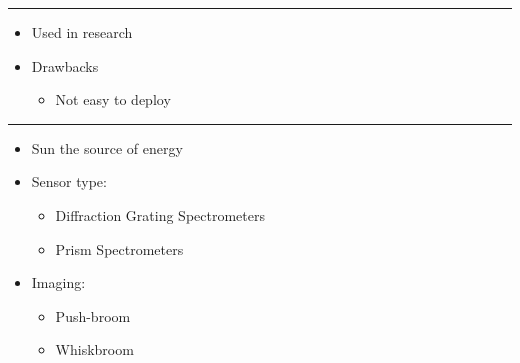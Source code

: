 \documentclass[12pt,preprintnumbers,amsmath,amssymb,nofootinbib,superscriptaddress]{revtex4-1}
\begin{document}

\newpage
{}
\vspace{-0.2cm}
\hrule
\vspace{0.8cm}

\begin{minipage}{0.6\textwidth}

\begin{itemize}
  \item Used in research
  \item Drawbacks 
  \begin{itemize}
    \item Not easy to deploy 
  \end{itemize}
\end{itemize}

\end{minipage}
\vspace{\fill}


\newpage
{}
\vspace{-0.2cm}
\hrule
\vspace{0.8cm}

\begin{minipage}{0.6\textwidth}

\begin{itemize}
  \item Sun the source of energy 
  \item Sensor type:
  \begin{itemize}
    \item Diffraction Grating Spectrometers
    \item Prism Spectrometers
  \end{itemize}
  \item Imaging: 
  \begin{itemize}
    \item Push-broom
    \item Whiskbroom
  \end{itemize}
\end{itemize}

\end{minipage}
\vspace{\fill}

\end{document}
